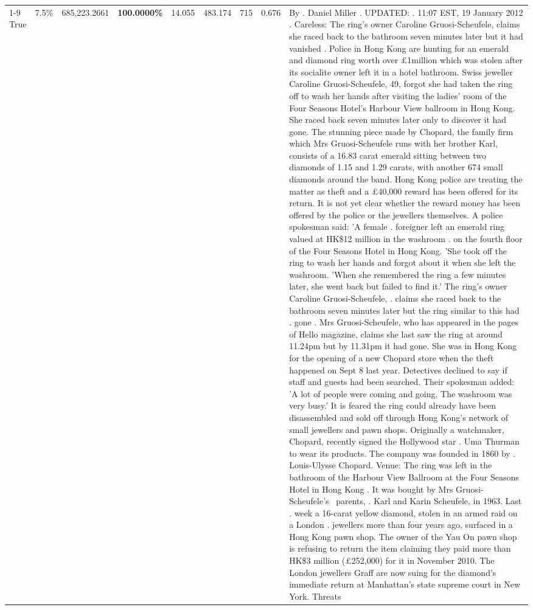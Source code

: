 \begin{table}[H]
\begin{tabular}{lllrlllll}
\cline{1-9}
True & 7.5\% & 685,223.2661 & \bfseries \color{red} 100.0000\% & 14.055 & 483.174 & 715 & 0.676 & By . Daniel Miller . UPDATED: . 11:07 EST, 19 January 2012 . Careless: The ring's owner Caroline Gruosi-Scheufele, claims she raced back to the bathroom seven minutes later but it had vanished . Police in Hong Kong are hunting for an emerald and diamond ring worth over £1million which was stolen after its socialite owner left it in a hotel bathroom. Swiss jeweller Caroline Gruosi-Scheufele, 49, forgot she had taken the ring off to wash her hands after visiting the ladies' room of the Four Seasons Hotel's Harbour View ballroom in Hong Kong. She raced back seven minutes later only to discover it had gone. The stunning piece made by Chopard, the family firm which Mrs Gruosi-Scheufele runs with her brother Karl, consists of a 16.83 carat emerald sitting between two diamonds of 1.15 and 1.29 carats, with another 674 small diamonds around the band. Hong Kong police are treating the matter as theft and a £40,000 reward has been offered for its return. It is not yet clear whether the reward money has been offered by the police or the jewellers themselves. A police spokesman said: 'A female . foreigner left an emerald ring valued at HK\$12 million in the washroom . on the fourth floor of the Four Seasons Hotel in Hong Kong. 'She took off the ring to wash her hands and forgot about it when she left the washroom. 'When she remembered the ring a few minutes later, she went back but failed to find it.' The ring's owner Caroline Gruosi-Scheufele, . claims she raced back to the bathroom seven minutes later but the ring similar to this had . gone . Mrs Gruosi-Scheufele, who has appeared in the pages of Hello magazine, claims she last saw the ring at around 11.24pm but by 11.31pm it had gone. She was in Hong Kong for the opening of a new Chopard store when the theft happened on Sept 8 last year. Detectives declined to say if staff and guests had been searched. Their spokesman added: 'A lot of people were coming and going. The washroom was very busy.' It is feared the ring could already have been disassembled and sold off through Hong Kong's network of small jewellers and pawn shops. Originally a watchmaker, Chopard, recently signed the Hollywood star . Uma Thurman to wear its products. The company was founded in 1860 by . Louis-Ulysse Chopard. Venue: The ring was left in the bathroom of the Harbour View Ballroom at the Four Seasons Hotel in Hong Kong . It was bought by Mrs Gruosi-Scheufele's  parents, . Karl and Karin Scheufele, in 1963. Last . week a 16-carat yellow diamond, stolen in an armed raid on a London . jewellers more than four years ago, surfaced in a Hong Kong pawn shop. The owner of the Yau On pawn shop is refusing to return the item claiming they paid more than HK\$3 million (£252,000) for it in November 2010. The London jewellers Graff are now suing for the diamond’s immediate return at Manhattan’s state supreme court in New York. Threats \\

\end{tabular}
\end{table}
